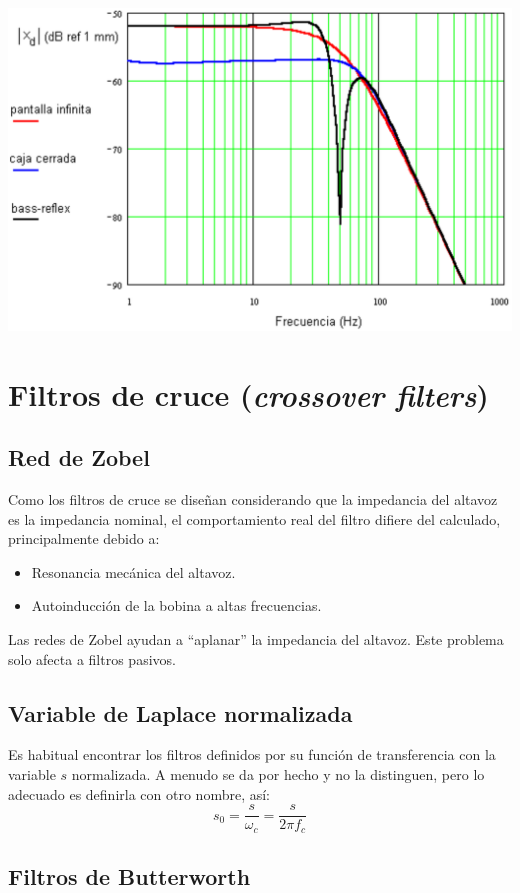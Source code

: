 \documentclass[a4paper, 8pt]{extarticle}
\begin{document}
\begin{multicols}{3}
\begin{center}
        \includegraphics[width=0.49\linewidth]{images/relacion_desplazamientos.png}
    \end{center}

    \section{Filtros de cruce (\textit{crossover filters})}

    \subsection{Red de Zobel}
    Como los filtros de cruce se diseñan considerando que la impedancia del altavoz es la impedancia nominal, el comportamiento real del filtro difiere del calculado, principalmente debido a:

    \begin{itemize}
        \item Resonancia mecánica del altavoz.
        \item Autoinducción de la bobina a altas frecuencias.
    \end{itemize}
    Las redes de Zobel ayudan a ``aplanar'' la impedancia del altavoz. Este problema solo afecta a filtros pasivos.

    \subsection{Variable de Laplace normalizada}
    Es habitual encontrar los filtros definidos por su función de transferencia con la variable $s$ normalizada. A menudo se da por hecho y no la distinguen, pero lo adecuado es definirla con otro nombre, así:
    \[s_0 = \frac{s}{\omega_c} = \frac{s}{2 \pi f_c}\]

    \subsection{Filtros de Butterworth}


\end{multicols}
\end{document}
